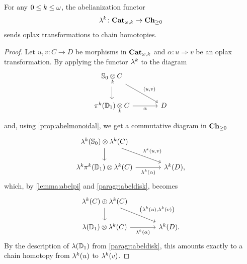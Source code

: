 \begin{corollary}\label{cor:abeltrans}
  For any $0 \leq k \leq \omega$, the abelianization functor
    \[
    \mathsf{\mathsf{\lambda}}^{k} \colon \mathbf{Cat}_{\omega,k} \to \mathbf{Ch}_{\geq 0}
  \]
  sends oplax transformations to chain homotopies. 
\end{corollary}
\begin{proof}
  Let $u,v\colon C\to D$ be morphisms in $\mathbf{Cat}_{\omega,k}$ and $\alpha:
  u\Rightarrow v$ be an oplax transformation. By applying the functor
  $\mathsf{\mathsf{\lambda}}^{k}$ to the diagram
   \[
    \begin{tikzcd}[column sep=large]
      \Sph{0}\grayk{k} C \ar[d] \ar[dr,"{\left(u,v\right)}"] & \\
      \opifun{k}(\Dsk{1})\grayk{k}C \ar[r,"\alpha"'] & D
    \end{tikzcd}
  \]
  and, using \cref{prop:abelmonoidal}, we get a commutative diagram in
  $\mathbf{Ch}_{\geq 0}$
  \[
  \begin{tikzcd}[column sep=large]
      \abelk{k}(\Sph{0})\otimes\abelk{k}(C) \ar[d] \ar[dr,"\abelk{k}\pair{u}{v}"] & \\
      \abelk{k}\opifun{k}(\Dsk{1})\otimes\abelk{k}(C) \ar[r,"\abelk{k}(\alpha)"'] & \abelk{k}(D),
    \end{tikzcd}
  \] 
which, by \cref{lemma:abelpi} and \ref{paragr:abeldisk}, becomes
\[
    \begin{tikzcd}[column sep=large]
     \abelk{k}(C)\oplus \abelk{k}(C) \ar[d] \ar[dr,"{\left(\abelk{k}(u),\abelk{k}(v)\right)}"] & \\
      \abel(\Dsk{1})\otimes\abelk{k}(C) \ar[r,"\abelk{k}(\alpha)"'] & \abelk{k}(D).
    \end{tikzcd}
  \]
 By the description of $\mathsf{\lambda}(\mathbb{D}_{1})$ from \ref{paragr:abeldisk},
  this amounts exactly to a chain homotopy from $\mathsf{\mathsf{\lambda}}^{k}(u)$ to $\mathsf{\mathsf{\lambda}}^{k}(v)$.
\end{proof}



